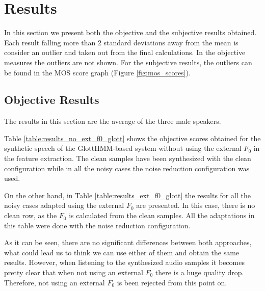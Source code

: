 \section{Results}
\label{results}
In this section we present both the objective and the subjective results obtained.
%
Each result falling more than 2 standard deviations away from the mean is consider an outlier and taken out from the final calculations.
%
In the objective measures the outliers are not shown.
%
For the subjective results, the outliers can be found in the MOS score graph (Figure \ref{fig:mos_scores}).

\subsection{Objective Results}
\label{results_objective}
The results in this section are the average of the three male speakers.

Table \ref{table:results_no_ext_f0_glott} shows the objective scores obtained for the synthetic speech of the GlottHMM-based system without using the external $F_{0}$ in the feature extraction.
%
The clean samples have been synthesized with the clean configuration while in all the noisy cases the noise reduction configuration was used. 

On the other hand, in Table \ref{table:results_ext_f0_glott} the results for all the noisy cases adapted using the external $F_{0}$ are presented.
%
In this case, there is no clean row, as the $F_{0}$ is calculated from the clean samples.
%
All the adaptations in this table were done with the noise reduction configuration.

As it can be seen, there are no significant differences between both approaches, what could lead us to think we can use either of them and obtain the same results.
%
However, when listening to the synthesized audio samples it becomes pretty clear that when not using an external $F_{0}$ there is a huge quality drop.
%
Therefore, not using an external $F_{0}$ is been rejected from this point on.

